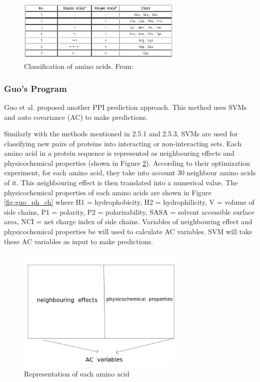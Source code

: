 \begin{figure}[h!]
\begin{center}
\includegraphics[height =5 cm, width = 8cm]{img/shen_clas.jpeg}
\caption{Classification of amino acids. From: \cite{Shen07_PPIpred} \label{fig:shen_clas}}
\end{center}
\end{figure}

\subsubsection{Guo's Program}
Guo et al. \cite{Guo08_PPIpred} proposed another PPI prediction approach.
This method uses SVMs and auto covariance (AC) to make predictions.

Similarly with the methods mentioned in 2.5.1 and 2.5.3, SVMs are used for classifying new pairs of proteins into interacting or non-interacting sets. Each amino acid in a protein sequence is represented as neighbouring effects and physicochemical properties (shown in Figure \ref{fig:guo_ac}). According to their optimization experiment, for each amino acid, they take into account 30 neighbour amino acids of it. This neighbouring effect is then translated into a numerical value. The physicochemical properties of each amino acids are shown in Figure \ref{fig:guo_ph_ch} where H1 = hydrophobicity, H2 = hydrophilicity, V = volume of side chains, P1 = polarity, P2 = polarizability, SASA = solvent accessible surface area, NCI = net charge index of side chains. Variables of neighbouring effect and physicochemical properties be will used to calculate AC variables. SVM will take these AC variables as input to make predictions.
\begin{figure}[h!]
\begin{center}
\includegraphics[height =6 cm, width = 8cm]{img/guo_ac.jpg}
\caption{Representation of each amino acid\label{fig:guo_ac}}
\end{center}
\end{figure}

